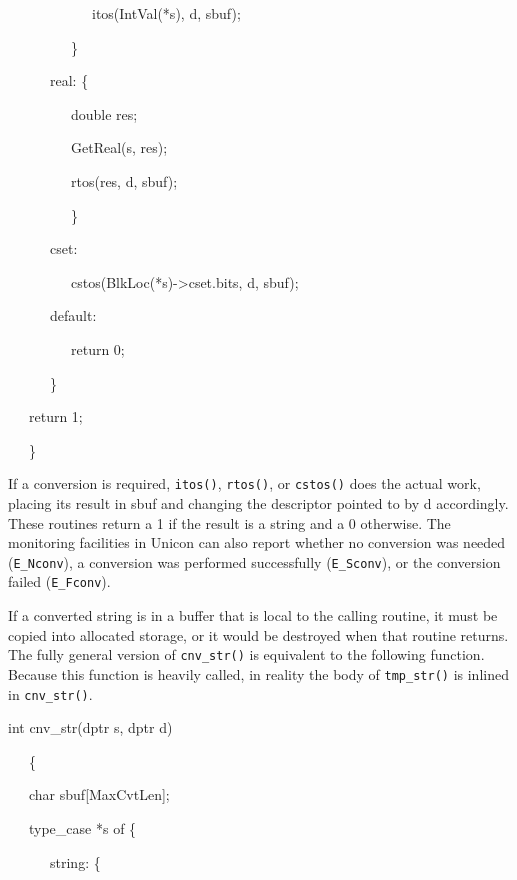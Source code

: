 {\ttfamily\mdseries
\ \ \ \ \ \ \ \ \ \ \ \ itos(IntVal(*s), d, sbuf);}

{\ttfamily\mdseries
\ \ \ \ \ \ \ \ \ \}}

{\ttfamily\mdseries
\ \ \ \ \ \ real: \{}

{\ttfamily\mdseries
\ \ \ \ \ \ \ \ \ double res;}

{\ttfamily\mdseries
\ \ \ \ \ \ \ \ \ GetReal(s, res);}

{\ttfamily\mdseries
\ \ \ \ \ \ \ \ \ rtos(res, d, sbuf);}

{\ttfamily\mdseries
\ \ \ \ \ \ \ \ \ \}}

{\ttfamily\mdseries
\ \ \ \ \ \ cset:}

{\ttfamily\mdseries
\ \ \ \ \ \ \ \ \ cstos(BlkLoc(*s)-{\textgreater}cset.bits, d, sbuf);}

{\ttfamily\mdseries
\ \ \ \ \ \ default:}

{\ttfamily\mdseries
\ \ \ \ \ \ \ \ \ return 0;}

{\ttfamily\mdseries
\ \ \ \ \ \ \}}

{\ttfamily\mdseries
\ \ \ return 1;}

{\ttfamily\mdseries
\ \ \ \}}

If a conversion is required, \texttt{itos()}, \texttt{rtos()}, or
\texttt{cstos()} does the actual work, placing its result in sbuf and
changing the descriptor pointed to by d accordingly. These routines
return a 1 if the result is a string and a 0 otherwise. The monitoring
facilities in Unicon can also report whether no conversion was needed
(\texttt{E\_Nconv}), a conversion was performed successfully
(\texttt{E\_Sconv}), or the conversion failed (\texttt{E\_Fconv}).

If a converted string is in a buffer that is local to the calling
routine, it must be copied into allocated storage, or it would be
destroyed when that routine returns. The fully general version of
\texttt{cnv\_str()} is equivalent to the following function. Because
this function is heavily called, in reality the body of
\texttt{tmp\_str()} is inlined in \texttt{cnv\_str()}.

{\ttfamily\mdseries
int cnv\_str(dptr s, dptr d)}

{\ttfamily\mdseries
\ \ \ \{}

{\ttfamily\mdseries
\ \ \ char sbuf[MaxCvtLen];}


\bigskip

{\ttfamily\mdseries
\ \ \ type\_case *s of \{}

{\ttfamily\mdseries
\ \ \ \ \ \ string: \{}


